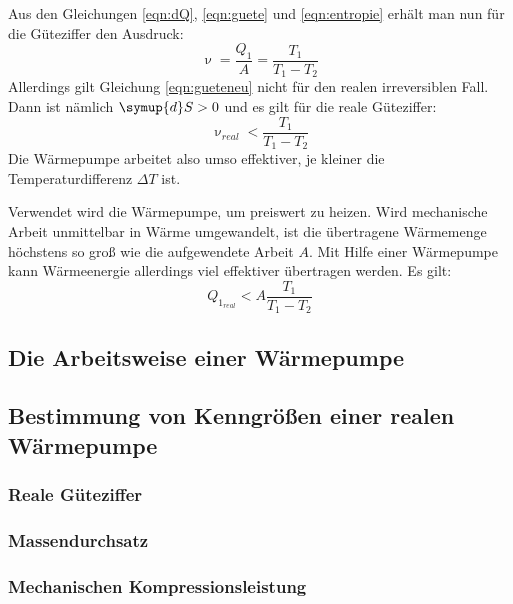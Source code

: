 Aus den Gleichungen \eqref{eqn:dQ}, \eqref{eqn:guete} und \eqref{eqn:entropie} erhält man nun für die Güteziffer den Ausdruck:
\begin{equation}
	\label{eqn:gueteneu}
	\upnu = \frac{Q_1}{A} = \frac{T_1}{T_1 - T_2}
\end{equation}
Allerdings gilt Gleichung \eqref{eqn:gueteneu} nicht für den realen irreversiblen Fall. 
Dann ist nämlich $\symup{d}S > 0$ und es gilt für die reale Güteziffer:
\begin{equation}
	\upnu_{real} < \frac{T_1}{T_1 - T_2}
\end{equation}
Die Wärmepumpe arbeitet also umso effektiver, je kleiner die Temperaturdifferenz $\Delta T$ ist.

Verwendet wird die Wärmepumpe, um preiswert zu heizen.
Wird mechanische Arbeit unmittelbar in Wärme umgewandelt, ist die übertragene Wärmemenge höchstens so groß wie die aufgewendete Arbeit $A$.
Mit Hilfe einer Wärmepumpe kann Wärmeenergie allerdings viel effektiver übertragen werden. Es gilt:
\begin{equation}
	Q_{1_{real}} < A \frac{T_1}{T_1 - T_2}
\end{equation}


\subsection{Die Arbeitsweise einer Wärmepumpe}



\subsection{Bestimmung von Kenngrößen einer realen Wärmepumpe}

\subsubsection {Reale Güteziffer}
\label{sec:gueteziffer}
\subsubsection {Massendurchsatz}
\label{sec:massendurchsatz}
\subsubsection {Mechanischen Kompressionsleistung} 
\label{sec:kompressorleistung}
